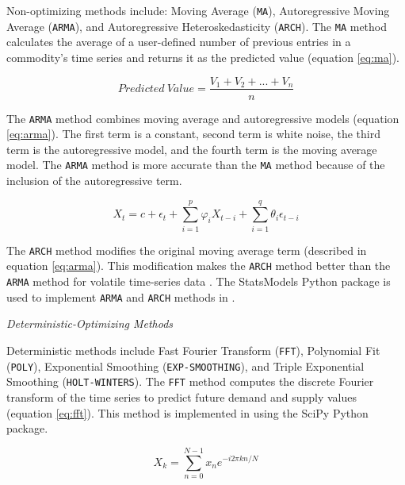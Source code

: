 Non-optimizing methods include: Moving Average (\texttt{MA}), 
Autoregressive Moving Average (\texttt{ARMA}), and 
Autoregressive Heteroskedasticity (\texttt{ARCH}). 
The \texttt{MA} method calculates the average of 
a user-defined number of previous entries in a commodity's 
time series and returns it as the predicted value 
(equation \ref{eq:ma}).

\begin{equation}
	\label{eq:ma}
	Predicted\ Value = \frac{V_1+V_2+...+V_n}{n}
\end{equation}

The \texttt{ARMA} method combines moving average and
autoregressive models (equation \ref{eq:arma}).
The first term is a constant, second term is 
white noise, the third term is the autoregressive
model, and the fourth term is the moving average
model.
The \texttt{ARMA} method is more accurate than the 
\texttt{MA} method 
because of the inclusion of the autoregressive term. 

\begin{equation}
	\label{eq:arma}
	X_t = c + \epsilon_t + 
	\sum_{i=1}^p\varphi_i X_{t-i} +	
	\sum_{i=1}^q\theta_i\epsilon_{t-i}
\end{equation}

The \texttt{ARCH} method modifies the original moving 
average term (described in equation \ref{eq:arma}). 
This modification makes the \texttt{ARCH} method 
better than the \texttt{ARMA} method for volatile 
time-series data \cite{flanagan_methods_2019}. 
The StatsModels \cite{github_community_statsmodels:_2019}
Python package is used to implement \texttt{ARMA} and 
\texttt{ARCH} methods in \deploy. 

\noindent
\textit{Deterministic-Optimizing Methods}

Deterministic methods include
Fast Fourier Transform (\texttt{FFT}), 
Polynomial Fit (\texttt{POLY}), 
Exponential Smoothing (\texttt{EXP-SMOOTHING}), 
and Triple Exponential Smoothing (\texttt{HOLT-WINTERS}). 
The \texttt{FFT} method computes the discrete Fourier transform 
of the time series to predict future demand and supply 
values (equation \ref{eq:fft}).
This method is implemented in \deploy using the 
SciPy \cite{jones_scipy:_2016} Python package. 

\begin{equation}
	\label{eq:fft}
	X_k = \sum_{n=0}^{N-1}x_n e^{-i2\pi kn/N}
\end{equation}

